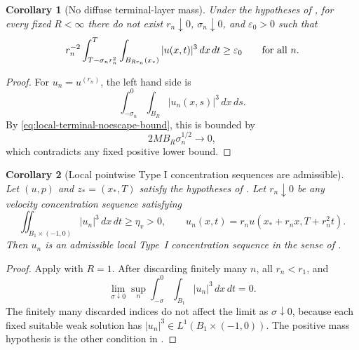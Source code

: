 \documentclass[11pt]{amsart}
\numberwithin{equation}{section}
\theoremstyle{plain}
\newtheorem{corollary}[corollary]{Corollary}
\theoremstyle{definition}
\theoremstyle{remark}
\begin{document}
\begin{corollary}[No diffuse terminal-layer mass]
\label{cor:no-diffuse-terminal-layer-mass}
Under the hypotheses of , for
every fixed \(R<\infty\) there do not exist \(r_n\downarrow0\),
\(\sigma_n\downarrow0\), and \(\varepsilon_0>0\) such that
\[
  r_n^{-2}
  \int_{T-\sigma_n r_n^2}^{T}
  \int_{B_{Rr_n}(x_*)}|u(x,t)|^3\,dx\,dt
  \ge \varepsilon_0
  \qquad\hbox{for all }n .
\]
\end{corollary}

\begin{proof}
For \(u_n=u^{(r_n)}\), the left hand side is
\[
   \int_{-\sigma_n}^{0}\int_{B_R}|u_n(x,s)|^3\,dx\,ds .
\]
By \eqref{eq:local-terminal-noescape-bound}, this is bounded by
\[
   2MB_R\sigma_n^{1/2}\to0,
\]
which contradicts any fixed positive lower bound.
\end{proof}

\begin{corollary}[Local pointwise Type I concentration sequences are admissible]
\label{cor:local-typeI-implies-admissible}
Let \((u,p)\) and \(z_*=(x_*,T)\) satisfy the hypotheses of
.  Let \(r_n\downarrow0\) be any
velocity concentration sequence satisfying
\[
   \iint_{B_1\times(-1,0)} |u_n|^3\,dx\,dt\ge\eta_v>0,
   \qquad
   u_n(x,t)=r_nu(x_*+r_nx,T+r_n^2t).
\]
Then \(u_n\) is an admissible local Type~I concentration sequence in the sense
of .
\end{corollary}

\begin{proof}
Apply  with \(R=1\).  After
discarding finitely many \(n\), all \(r_n<r_1\), and
\[
   \lim_{\sigma\downarrow0}
   \sup_n
   \int_{-\sigma}^{0}\int_{B_1}|u_n|^3\,dx\,dt=0 .
\]
The finitely many discarded indices do not affect the limit as
\(\sigma\downarrow0\), because each fixed suitable weak solution has
\(|u_n|^3\in L^1(B_1\times(-1,0))\).  The positive mass hypothesis is the other
condition in .
\end{proof}
\end{document}
